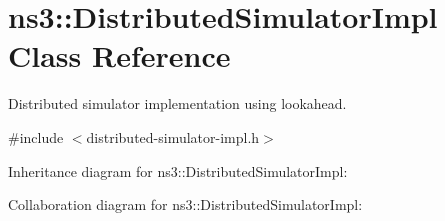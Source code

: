 \hypertarget{classns3_1_1DistributedSimulatorImpl}{}\section{ns3\+:\+:Distributed\+Simulator\+Impl Class Reference}
\label{classns3_1_1DistributedSimulatorImpl}


Distributed simulator implementation using lookahead.  




{\ttfamily \#include $<$distributed-\/simulator-\/impl.\+h$>$}



Inheritance diagram for ns3\+:\+:Distributed\+Simulator\+Impl\+:


Collaboration diagram for ns3\+:\+:Distributed\+Simulator\+Impl\+:
